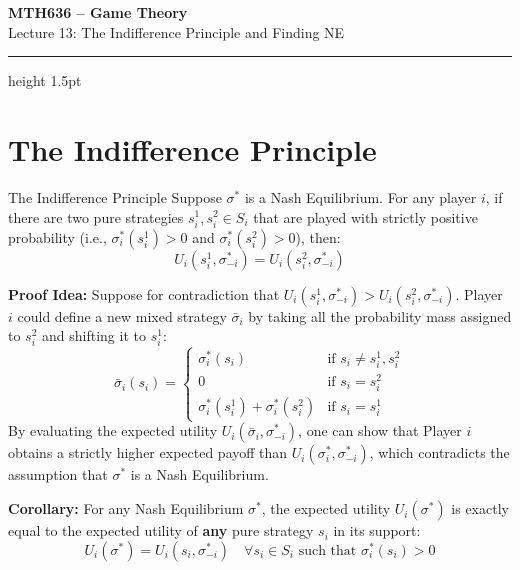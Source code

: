 \documentclass[12pt, a4paper]{article}
\begin{document}
\begin{center}
  {\LARGE\bfseries\sffamily\color{defblue} MTH636 -- Game Theory}\\[6pt]
  {\Large\sffamily Lecture 13: The Indifference Principle and Finding NE}\\[4pt]
\end{center}
\vspace{0.5cm}
\hrule height 1.5pt
\vspace{0.3cm}

\section{The Indifference Principle}

\begin{thmbox}{The Indifference Principle}
  Suppose $\sigma^*$ is a Nash Equilibrium. For any player $i$, if there are two pure strategies $s_i^1, s_i^2 \in S_i$ that are played with strictly positive probability (i.e., $\sigma_i^*(s_i^1) > 0$ and $\sigma_i^*(s_i^2) > 0$), then:
  \[
    U_i(s_i^1, \sigma_{-i}^*) = U_i(s_i^2, \sigma_{-i}^*)
  \]
\end{thmbox}

\textbf{Proof Idea:}
Suppose for contradiction that $U_i(s_i^1, \sigma_{-i}^*) > U_i(s_i^2, \sigma_{-i}^*)$. 
Player $i$ could define a new mixed strategy $\bar{\sigma}_i$ by taking all the probability mass assigned to $s_i^2$ and shifting it to $s_i^1$:
\[
  \bar{\sigma}_i(s_i) = \begin{cases} 
    \sigma_i^*(s_i) & \text{if } s_i \neq s_i^1, s_i^2 \\ 
    0 & \text{if } s_i = s_i^2 \\ 
    \sigma_i^*(s_i^1) + \sigma_i^*(s_i^2) & \text{if } s_i = s_i^1 
  \end{cases}
\]
By evaluating the expected utility $U_i(\bar{\sigma}_i, \sigma_{-i}^*)$, one can show that Player $i$ obtains a strictly higher expected payoff than $U_i(\sigma_i^*, \sigma_{-i}^*)$, which contradicts the assumption that $\sigma^*$ is a Nash Equilibrium.

\begin{notebox}
  \textbf{Corollary:} For any Nash Equilibrium $\sigma^*$, the expected utility $U_i(\sigma^*)$ is exactly equal to the expected utility of \textbf{any} pure strategy $s_i$ in its support:
  \[
    U_i(\sigma^*) = U_i(s_i, \sigma_{-i}^*) \quad \forall s_i \in S_i \text{ such that } \sigma_i^*(s_i) > 0
  \]
\end{notebox}
\end{document}
